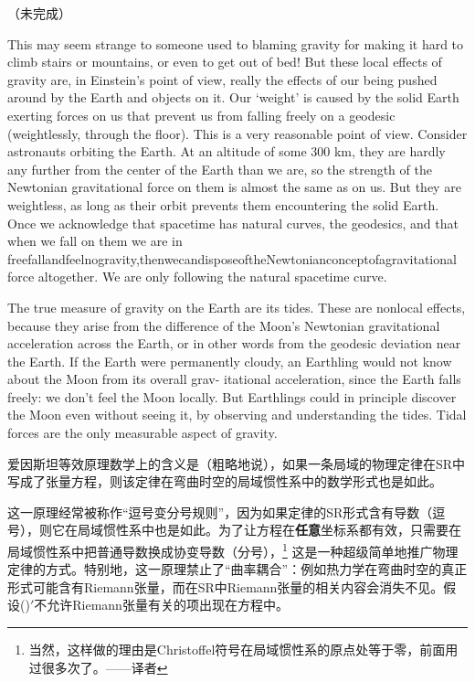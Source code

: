 （未完成）

This may seem strange to someone used to blaming gravity for making it hard to climb
stairs or mountains, or even to get out of bed! But these local effects of gravity are, in
Einstein’s point of view, really the effects of our being pushed around by the Earth and
objects on it. Our ‘weight’ is caused by the solid Earth exerting forces on us that prevent us
from falling freely on a geodesic (weightlessly, through the floor). This is a very reasonable
point of view. Consider astronauts orbiting the Earth. At an altitude of some 300 km, they
are hardly any further from the center of the Earth than we are, so the strength of the
Newtonian gravitational force on them is almost the same as on us. But they are weightless,
as long as their orbit prevents them encountering the solid Earth. Once we acknowledge
that spacetime has natural curves, the geodesics, and that when we fall on them we are in
freefallandfeelnogravity,thenwecandisposeoftheNewtonianconceptofagravitational
force altogether. We are only following the natural spacetime curve.


The true measure of gravity on the Earth are its tides. These are nonlocal effects, because
they arise from the difference of the Moon’s Newtonian gravitational acceleration across
the Earth, or in other words from the geodesic deviation near the Earth. If the Earth were
permanently cloudy, an Earthling would not know about the Moon from its overall grav-
itational acceleration, since the Earth falls freely: we don’t feel the Moon locally. But
Earthlings could in principle discover the Moon even without seeing it, by observing and
understanding the tides. Tidal forces are the only measurable aspect of gravity.

爱因斯坦等效原理数学上的含义是（粗略地说），如果一条局域的物理定律在SR中写成了张量方程，则该定律在弯曲时空的局域惯性系中的数学形式也是如此。

这一原理经常被称作“逗号变分号规则”，因为如果定律的SR形式含有导数（逗号），则它在局域惯性系中也是如此。为了让方程在\textbf{任意}坐标系都有效，只需要在局域惯性系中把普通导数换成协变导数（分号），\footnote{当然，这样做的理由是Christoffel符号在局域惯性系的原点处等于零，前面用过很多次了。——译者} 这是一种超级简单地推广物理定律的方式。特别地，这一原理禁止了“曲率耦合”：例如热力学在弯曲时空的真正形式可能含有Riemann张量，而在SR中Riemann张量的相关内容会消失不见。假设(\uppercase\expandafter{})$'$不允许Riemann张量有关的项出现在方程中。

